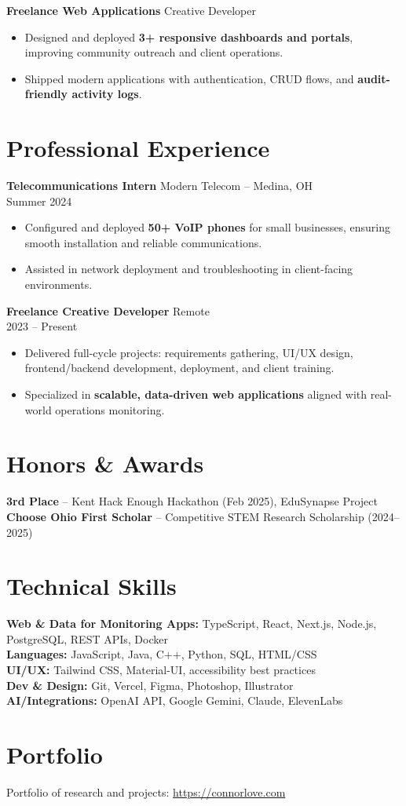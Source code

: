 \documentclass[10pt]{article}
\begin{document}
\textbf{Freelance Web Applications} \hfill Creative Developer
\begin{itemize}
    \item Designed and deployed \textbf{3+ responsive dashboards and portals}, improving community outreach and client operations.
    \item Shipped modern applications with authentication, CRUD flows, and \textbf{audit-friendly activity logs}.
\end{itemize}

\section*{Professional Experience}
\textbf{Telecommunications Intern} \hfill Modern Telecom -- Medina, OH \\
Summer 2024
\begin{itemize}
    \item Configured and deployed \textbf{50+ VoIP phones} for small businesses, ensuring smooth installation and reliable communications.
    \item Assisted in network deployment and troubleshooting in client-facing environments.
\end{itemize}

\textbf{Freelance Creative Developer} \hfill Remote \\
2023 -- Present
\begin{itemize}
    \item Delivered full-cycle projects: requirements gathering, UI/UX design, frontend/backend development, deployment, and client training.
    \item Specialized in \textbf{scalable, data-driven web applications} aligned with real-world operations monitoring.
\end{itemize}

\section*{Honors \& Awards}
\textbf{3rd Place} -- Kent Hack Enough Hackathon (Feb 2025), EduSynapse Project \\
\textbf{Choose Ohio First Scholar} -- Competitive STEM Research Scholarship (2024--2025) \\

\section*{Technical Skills}
\textbf{Web \& Data for Monitoring Apps:} TypeScript, React, Next.js, Node.js, PostgreSQL, REST APIs, Docker \\
\textbf{Languages:} JavaScript, Java, C++, Python, SQL, HTML/CSS \\
\textbf{UI/UX:} Tailwind CSS, Material-UI, accessibility best practices \\
\textbf{Dev \& Design:} Git, Vercel, Figma, Photoshop, Illustrator \\
\textbf{AI/Integrations:} OpenAI API, Google Gemini, Claude, ElevenLabs \\

\section*{Portfolio}
Portfolio of research and projects: \href{https://connorlove.com}{https://connorlove.com}
\end{document}

